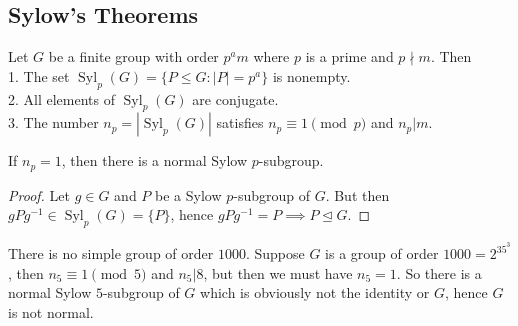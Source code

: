 \subsection{Sylow's Theorems}
\begin{theorem}
    Let $G$ be a finite group with order $p^am$ where $p$ is a prime and $p\nmid m$.
    Then\\
    1. The set $\operatorname{Syl}_p(G)=\{P\le G:|P|=p^a\}$ is nonempty.\\
    2. All elements of $\operatorname{Syl}_p(G)$ are conjugate.\\
    3. The number $n_p=|\operatorname{Syl}_p(G)|$ satisfies $n_p\equiv 1\pmod{p}$ and $n_p|m$.
\end{theorem}
\begin{corollary}
    If $n_p=1$, then there is a normal Sylow $p$-subgroup.
\end{corollary}
\begin{proof}
    Let $g\in G$ and $P$ be a Sylow $p$-subgroup of $G$.
    But then $gPg^{-1}\in\operatorname{Syl}_p(G)=\{P\}$, hence $gPg^{-1}=P\implies P\unlhd G$.
\end{proof}
\begin{example}
    There is no simple group of order $1000$.
    Suppose $G$ is a group of order $1000=2^35^3$, then $n_5\equiv 1\pmod{5}$ and $n_5|8$, but then we must have $n_5=1$.
    So there is a normal Sylow $5$-subgroup of $G$ which is obviously not the identity or $G$, hence $G$ is not normal.
\end{example}
